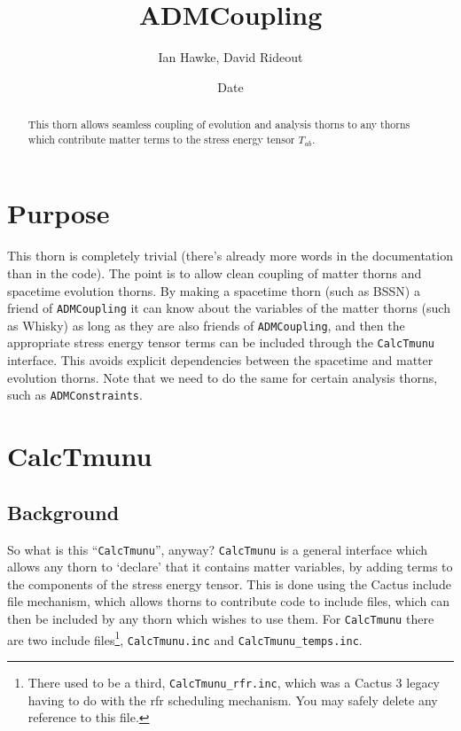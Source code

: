 \documentclass{article}
\begin{document}
\title{ADMCoupling}
\author{Ian Hawke, David Rideout}
\date{$ $Date$ $}

\maketitle


\begin{abstract}
This thorn allows seamless coupling of evolution and analysis thorns
to any thorns which contribute matter terms to the stress energy
tensor $T_{ab}$.
\end{abstract} 

\section{Purpose}

This thorn is completely trivial (there's already more words in the
documentation than in the code). The point is to allow clean coupling
of matter thorns and spacetime evolution thorns. By making a spacetime
thorn (such as BSSN) a friend of \texttt{ADMCoupling} it can know about the
variables of the matter thorns (such as Whisky) as long as they are
also friends of \texttt{ADMCoupling}, and then the appropriate stress energy
tensor terms can be included through the {\tt CalcTmunu} interface.
This avoids explicit dependencies between the spacetime and matter
evolution thorns. Note that we need to do the same for certain
analysis thorns, such as \texttt{ADMConstraints}.

\section{CalcTmunu}

\subsection{Background}
So what is this ``\texttt{CalcTmunu}'', anyway?
\texttt{CalcTmunu} is a general interface which allows any thorn to
`declare' that it contains matter variables, by adding terms to the
components of the stress energy tensor.  This is done using the Cactus
include file mechanism, which allows thorns to contribute code to
include files, which can then be included by any thorn which wishes to
use them.
For \texttt{CalcTmunu} there are two include files\footnote{There used
to be a third, \texttt{CalcTmunu\_rfr.inc}, which was a Cactus 3 legacy
having to do with the rfr scheduling mechanism.  You may safely delete
any reference to this file.},
\texttt{CalcTmunu.inc} and \texttt{CalcTmunu\_temps.inc}.  
\end{document}
